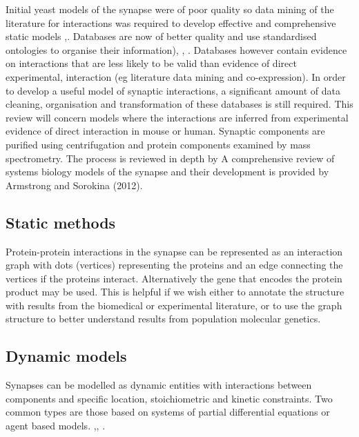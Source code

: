 Initial yeast models of the synapse were of poor quality so data mining of the literature for interactions was required to develop effective and comprehensive static models \cite{pocklington2006proteomes},\cite{armstrong2012evolution}. Databases are now of better quality and use standardised ontologies to organise their information)\cite{brazma2006standards}, \cite{hermjakob2004hupo}, \cite{kerrien2007broadening}. Databases however contain evidence on interactions that are less likely to be valid than evidence of direct experimental, interaction (eg literature data mining and co-expression). In order to develop a useful model of synaptic interactions, a significant amount of data cleaning, organisation and transformation of these databases is still required. This review will concern models where the interactions are inferred from experimental evidence of direct interaction in mouse or human. Synaptic components are purified using centrifugation and protein components examined by mass spectrometry. The process is reviewed in depth by \cite{lassek2014proteome} A comprehensive review of systems biology models of the synapse and their development is provided by Armstrong and Sorokina (2012). \cite{armstrong2012evolution}

\subsection{Static methods}

Protein-protein interactions in the synapse can be represented as an interaction graph with dots (vertices) representing the proteins and an edge connecting the vertices if the proteins interact. Alternatively the gene that encodes the protein product may be used. This is helpful if we wish either to annotate the structure with results from the biomedical or experimental literature, or to use the graph structure to better understand results from population molecular genetics. 

\subsection{Dynamic models}

Synapses can be modelled as dynamic entities with interactions between components and specific location, stoichiometric and kinetic constraints. Two common types are those based on systems of partial differential equations or agent based models. \cite{sorokina2013simulator},\cite{sorokin2014rkappa}, \cite{walpole2013multiscale}.

